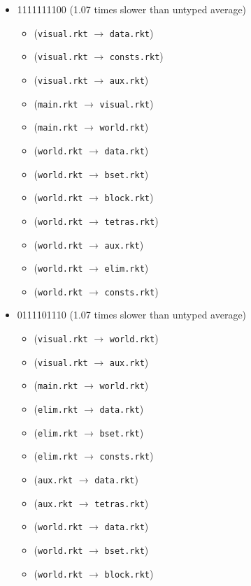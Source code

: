 \documentclass{article}
\newcommand{\mono}[1]{\texttt{#1}}
\begin{document}
\begin{itemize}
\begin{itemize}
  \end{itemize}
\item 1111111100 (1.07 times slower than untyped average)
  \begin{itemize}
  \item (\mono{visual.rkt} $\rightarrow$ \mono{data.rkt})
  \item (\mono{visual.rkt} $\rightarrow$ \mono{consts.rkt})
  \item (\mono{visual.rkt} $\rightarrow$ \mono{aux.rkt})
  \item (\mono{main.rkt} $\rightarrow$ \mono{visual.rkt})
  \item (\mono{main.rkt} $\rightarrow$ \mono{world.rkt})
  \item (\mono{world.rkt} $\rightarrow$ \mono{data.rkt})
  \item (\mono{world.rkt} $\rightarrow$ \mono{bset.rkt})
  \item (\mono{world.rkt} $\rightarrow$ \mono{block.rkt})
  \item (\mono{world.rkt} $\rightarrow$ \mono{tetras.rkt})
  \item (\mono{world.rkt} $\rightarrow$ \mono{aux.rkt})
  \item (\mono{world.rkt} $\rightarrow$ \mono{elim.rkt})
  \item (\mono{world.rkt} $\rightarrow$ \mono{consts.rkt})
  \end{itemize}
\item 0111101110 (1.07 times slower than untyped average)
  \begin{itemize}
  \item (\mono{visual.rkt} $\rightarrow$ \mono{world.rkt})
  \item (\mono{visual.rkt} $\rightarrow$ \mono{aux.rkt})
  \item (\mono{main.rkt} $\rightarrow$ \mono{world.rkt})
  \item (\mono{elim.rkt} $\rightarrow$ \mono{data.rkt})
  \item (\mono{elim.rkt} $\rightarrow$ \mono{bset.rkt})
  \item (\mono{elim.rkt} $\rightarrow$ \mono{consts.rkt})
  \item (\mono{aux.rkt} $\rightarrow$ \mono{data.rkt})
  \item (\mono{aux.rkt} $\rightarrow$ \mono{tetras.rkt})
  \item (\mono{world.rkt} $\rightarrow$ \mono{data.rkt})
  \item (\mono{world.rkt} $\rightarrow$ \mono{bset.rkt})
  \item (\mono{world.rkt} $\rightarrow$ \mono{block.rkt})

\end{itemize}
\end{itemize}
\end{document}
